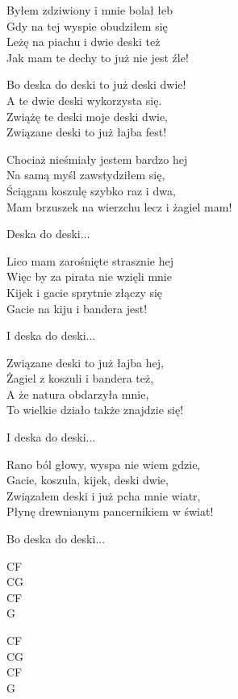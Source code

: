 \begin{text}
    Byłem zdziwiony i mnie bolał łeb\\
    Gdy na tej wyspie obudziłem się\\
    Leżę na piachu i dwie deski też\\
    Jak mam te dechy to już nie jest źle!

    \vin Bo deska do deski to już deski dwie!\\
    \vin A te dwie deski wykorzysta się.\\
    \vin Zwiążę te deski moje deski dwie,\\
    \vin Związane deski to już łajba fest!

    Chociaż nieśmiały jestem bardzo hej\\
    Na samą myśl zawstydziłem się,\\
    Ściągam koszulę szybko raz i dwa,\\
    Mam brzuszek na wierzchu lecz i żagiel mam!

    \vin Deska do deski...

    Lico mam zarośnięte strasznie hej\\
    Więc by za pirata nie wzięli mnie\\
    Kijek i gacie sprytnie złączy się\\
    Gacie na kiju i bandera jest!

    \vin I deska do deski...

    Związane deski to już łajba hej,\\
    Żagiel z koszuli i bandera też,\\
    A że natura obdarzyła mnie,\\
    To wielkie działo także znajdzie się!

    \vin I deska do deski...

    Rano ból głowy, wyspa nie wiem gdzie,\\
    Gacie, koszula, kijek, deski dwie,\\
    Związałem deski i już pcha mnie wiatr,\\
    Płynę drewnianym pancernikiem w świat!

    \vin Bo deska do deski...

\end{text}
\begin{chord}
    CF\\
    CG\\
    CF\\
    G

    CF\\
    CG\\
    CF\\
    G

\end{chord}